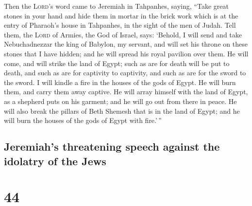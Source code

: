  Then the \textsc{Lord}'s word came to Jeremiah in
Tahpanhes, saying,  ``Take great stones in your hand and
hide them in mortar in the brick work which is at the entry of Pharaoh's
house in Tahpanhes, in the sight of the men of Judah. 
Tell them, the \textsc{Lord} of Armies, the God of Israel, says:
`Behold, I will send and take Nebuchadnezzar the king of Babylon, my
servant, and will set his throne on these stones that I have hidden; and
he will spread his royal pavilion over them.  He will
come, and will strike the land of Egypt; such as are for death will be
put to death, and such as are for captivity to captivity, and such as
are for the sword to the sword.  I will kindle a fire in
the houses of the gods of Egypt. He will burn them, and carry them away
captive. He will array himself with the land of Egypt, as a shepherd
puts on his garment; and he will go out from there in peace.
 He will also break the pillars of Beth Shemesh that is
in the land of Egypt; and he will burn the houses of the gods of Egypt
with fire.'\,''

\hypertarget{jeremiahs-threatening-speech-against-the-idolatry-of-the-jews}{%
\subsection{Jeremiah's threatening speech against the idolatry of the
Jews}\label{jeremiahs-threatening-speech-against-the-idolatry-of-the-jews}}

\hypertarget{section-43}{%
\section{44}\label{section-43}}

